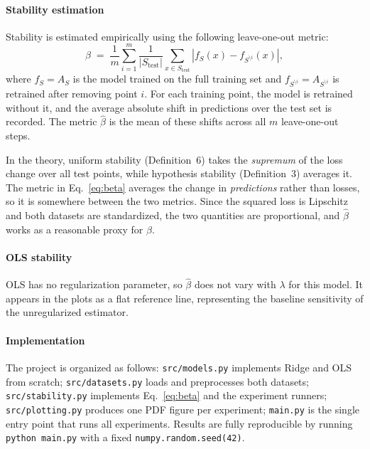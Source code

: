 \documentclass[11pt, a4paper, twoside]{article}
\newcommand{\abs}[1]{\left| #1 \right|}
\newcommand{\AS}{A_S}
\newcommand{\ASi}{A_{S^{\setminus i}}}
\newcommand{\betahat}{\hat{\beta}}
\begin{document}
\paragraph{Stability estimation}
Stability is estimated empirically using the following leave-one-out metric:
\begin{equation}
    \betahat \;=\; \frac{1}{m} \sum_{i=1}^{m}
    \frac{1}{|S_\text{test}|}
    \sum_{x \in S_\text{test}} \abs{f_S(x) - f_{S^{\setminus i}}(x)},
    \label{eq:beta}
\end{equation}
where $f_S = \AS$ is the model trained on the full training set and
$f_{S^{\setminus i}} = \ASi$ is retrained after removing point $i$.
For each training point, the model is retrained without it, and the average
absolute shift in predictions over the test set is recorded. The metric $\betahat$
is the mean of these shifts across all $m$ leave-one-out steps.

In the theory, uniform stability (Definition~6) takes the
\emph{supremum} of the loss change over all test points, while hypothesis stability
(Definition~3) averages it. The metric in Eq.~\eqref{eq:beta} averages the change in
\emph{predictions} rather than losses, so it is somewhere between the two metrics.
Since the squared loss is Lipschitz and both datasets are standardized, the two
quantities are proportional, and $\betahat$ works as a reasonable proxy for $\beta$.

\paragraph{OLS stability}
OLS has no regularization parameter, so $\betahat$ does not vary with $\lambda$ for
this model. It appears in the plots as a flat reference line, representing the
baseline sensitivity of the unregularized estimator.

\paragraph{Implementation}
The project is organized as follows:
\texttt{src/models.py} implements Ridge and OLS from scratch;
\texttt{src/datasets.py} loads and preprocesses both datasets;
\texttt{src/stability.py} implements Eq.~\eqref{eq:beta} and the experiment runners;
\texttt{src/plotting.py} produces one PDF figure per experiment;
\texttt{main.py} is the single entry point that runs all experiments.
Results are fully reproducible by running \texttt{python main.py}
with a fixed \texttt{numpy.random.seed(42)}.
\end{document}
